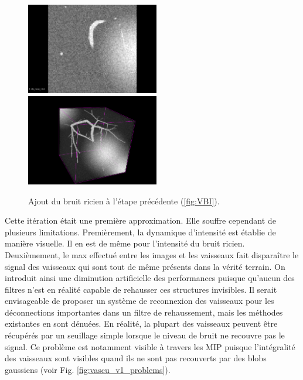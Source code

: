 \begin{figure}[!ht]
  \centering
  \includegraphics[height=4cm]{Images/2D_VBIR10.png}
  \includegraphics[height=4cm]{Images/3D_VBIR10.png}
  
  \caption{Ajout du bruit ricien à l'étape précédente (\ref{fig:VBI}).}
  \label{fig:VBIR}
\end{figure}

Cette itération était une première approximation. Elle souffre cependant de plusieurs limitations. Premièrement, la dynamique d'intensité est établie de manière visuelle. Il en est de même pour l'intensité du bruit ricien. Deuxièmement, le max effectué entre les images et les vaisseaux fait disparaître le signal des vaisseaux qui sont tout de même présents dans la vérité terrain. On introduit ainsi une diminution artificielle des performances puisque qu'aucun des filtres n'est en réalité capable de rehausser ces structures invisibles. Il serait envisageable de proposer un système de reconnexion des vaisseaux pour les déconnections importantes dans un filtre de rehaussement, mais les méthodes existantes en sont dénuées. En réalité, la plupart des vaisseaux peuvent être récupérés par un seuillage simple lorsque le niveau de bruit ne recouvre pas le signal. Ce problème est notamment visible à travers les MIP puisque l'intégralité des vaisseaux sont visibles quand ils ne sont pas recouverts par des blobs gaussiens (voir Fig. \ref{fig:vascu_v1_problems}).

